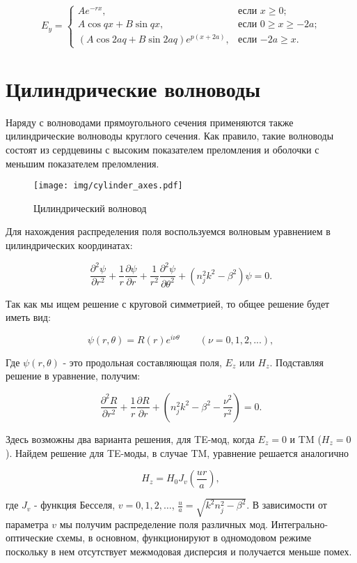\begin{equation}
	E_y =
	\begin{cases}
		Ae^{-rx}, &\text{если $x \geqslant 0$;}\\
		A\cos qx + B\sin qx, &\text{если $0 \geqslant x \geqslant -2a $;}\\
		(A\cos 2aq + B\sin 2aq)e^{p(x+2a)}, &\text{если $-2a \geqslant x$.}
	\end{cases}
\end{equation}

\section{Цилиндрические волноводы}
\label{cylinder_waveguides}
Наряду с волноводами прямоугольного сечения применяются также цилиндрические волноводы круглого сечения. Как правило, такие волноводы состоят из сердцевины с высоким показателем преломления и оболочки с меньшим показателем преломления. 

\begin{figure}[h!]
	\texttt{[image: img/cylinder\_axes.pdf]}
	\caption{Цилиндрический волновод}
\end{figure}

Для нахождения распределения поля воспользуемся волновым уравнением в цилиндрических координатах:

\begin{equation}
	\frac{\partial^2\psi}{\partial r^2} + \frac{1}{r}\frac{\partial\psi}{\partial r}+\frac{1}{r^2}\frac{\partial^2\psi}{\partial\theta^2}+(n_j^2 k^2 - \beta^2)\psi = 0.
\end{equation}

Так как мы ищем решение с круговой симметрией, то общее решение будет иметь вид:

\begin{equation}
	\psi(r, \theta) = R(r)e^{i\nu\theta} \qquad (\nu = 0,1,2, ...),
\end{equation}

Где $\psi(r, \theta)$ - это продольная составляющая поля, $E_z$ или $H_z$. Подставляя решение в уравнение, получим:

\begin{equation}
	\frac{\partial^2 R}{\partial r^2} + \frac{1}{r}\frac{\partial R}{\partial r}+(n_j^2 k^2 - \beta^2 - \frac{\nu^2}{r^2}) = 0.
\end{equation}

Здесь возможны два варианта решения, для TE-мод, когда $E_z = 0$ и TM ($H_z = 0$). Найдем решение для TE-моды, в случае TM, уравнение решается аналогично

\begin{equation}
	H_z = H_0 J_v (\frac{ur}{a}),
	\label{cylinder_bessel}
\end{equation}

где $J_v$ - функция Бесселя, $v = 0, 1, 2,\ldots$, $\frac{u}{a} = \sqrt{k^2 n_j^2 - \beta^2}$. В зависимости от параметра $v$ мы получим распределение поля различных мод. Интегрально-оптические схемы, в основном, функционируют в одномодовом режиме поскольку в нем отсутствует межмодовая дисперсия и получается меньше помех.